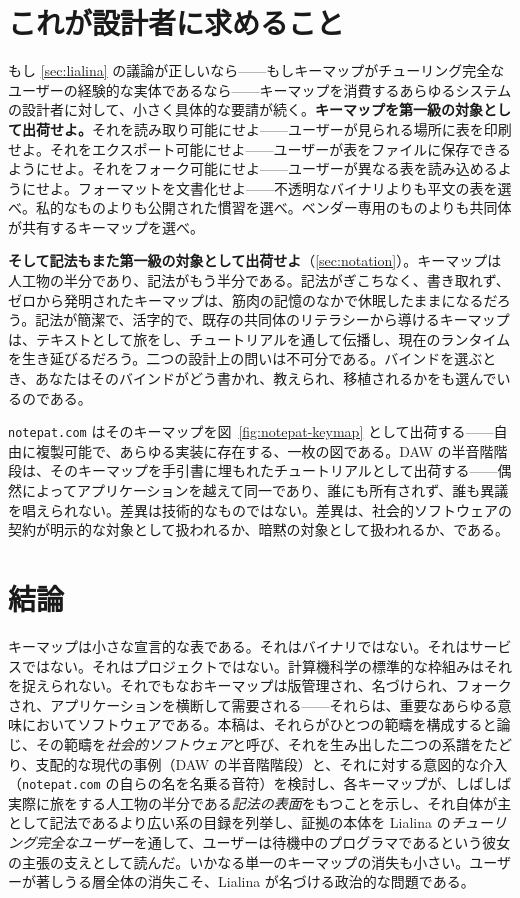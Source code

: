 \documentclass[10pt,letterpaper,twocolumn]{article}
\begin{document}
\section{これが設計者に求めること}
\label{sec:design}

もし \textsection\ref{sec:lialina} の議論が正しいなら——もしキーマップがチューリング完全なユーザーの経験的な実体であるなら——キーマップを消費するあらゆるシステムの設計者に対して、小さく具体的な要請が続く。\textbf{キーマップを第一級の対象として出荷せよ。}それを読み取り可能にせよ——ユーザーが見られる場所に表を印刷せよ。それをエクスポート可能にせよ——ユーザーが表をファイルに保存できるようにせよ。それをフォーク可能にせよ——ユーザーが異なる表を読み込めるようにせよ。フォーマットを文書化せよ——不透明なバイナリよりも平文の表を選べ。私的なものよりも公開された慣習を選べ。ベンダー専用のものよりも共同体が共有するキーマップを選べ。

\textbf{そして記法もまた第一級の対象として出荷せよ}（\textsection\ref{sec:notation}）。キーマップは人工物の半分であり、記法がもう半分である。記法がぎこちなく、書き取れず、ゼロから発明されたキーマップは、筋肉の記憶のなかで休眠したままになるだろう。記法が簡潔で、活字的で、既存の共同体のリテラシーから導けるキーマップは、テキストとして旅をし、チュートリアルを通して伝播し、現在のランタイムを生き延びるだろう。二つの設計上の問いは不可分である。バインドを選ぶとき、あなたはそのバインドがどう書かれ、教えられ、移植されるかをも選んでいるのである。

\texttt{notepat.com} はそのキーマップを図~\ref{fig:notepat-keymap} として出荷する——自由に複製可能で、あらゆる実装に存在する、一枚の図である。DAW の半音階階段は、そのキーマップを手引書に埋もれたチュートリアルとして出荷する——偶然によってアプリケーションを越えて同一であり、誰にも所有されず、誰も異議を唱えられない。差異は技術的なものではない。差異は、社会的ソフトウェアの契約が明示的な対象として扱われるか、暗黙の対象として扱われるか、である。

\section{結論}

キーマップは小さな宣言的な表である。それはバイナリではない。それはサービスではない。それはプロジェクトではない。計算機科学の標準的な枠組みはそれを捉えられない。それでもなおキーマップは版管理され、名づけられ、フォークされ、アプリケーションを横断して需要される——それらは、重要なあらゆる意味においてソフトウェアである。本稿は、それらがひとつの範疇を構成すると論じ、その範疇を\emph{社会的ソフトウェア}と呼び、それを生み出した二つの系譜をたどり、支配的な現代の事例（DAW の半音階階段）と、それに対する意図的な介入（\texttt{notepat.com} の自らの名を名乗る音符）を検討し、各キーマップが、しばしば実際に旅をする人工物の半分である\emph{記法の表面}をもつことを示し、それ自体が主として記法であるより広い系の目録を列挙し、証拠の本体を Lialina の\emph{チューリング完全なユーザー}を通して、ユーザーは待機中のプログラマであるという彼女の主張の支えとして読んだ。いかなる単一のキーマップの消失も小さい。ユーザーが著しうる層全体の消失こそ、Lialina が名づける政治的な問題である。
\end{document}
